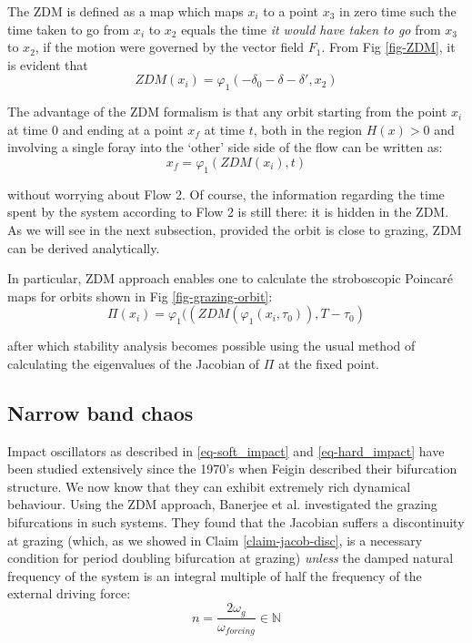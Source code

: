 \documentclass{book}
\renewcommand{\(}{\begin{columns}}
\renewcommand{\)}{\end{columns}}
\newcommand{\<}[1]{\begin{column}{#1}}
\renewcommand{\>}{\end{column}}
\begin{document}
The ZDM is defined as a map which maps $x_i$ to a point $x_3$ in zero time 
such the time taken to go from $x_i$ to $x_2$ equals the time \emph{it would 
have taken to go} from 
$x_3$ to $x_2$, if the motion were governed by the vector field $F_1$.   From Fig \ref{fig-ZDM}, it is evident that \[
ZDM(x_i)=\varphi_1(-\delta_0-\delta-\delta',x_2)
\] 

The advantage of the ZDM formalism is that any orbit starting from the point 
$x_i$ at time $0$ and ending at a point $x_f$ at time $t$, both in the region $H(x)>0$ and involving a single foray 
into the `other' side side of the flow can be written as:
\begin{equation}
\label{trajeq-ZDM}
x_f=\varphi_1(ZDM(x_i),t)
\end{equation}

without worrying about Flow 2. Of course, the information regarding the time  
spent  by the system according to Flow 2 is still there: it is hidden in the ZDM.  As 
we will see in the next subsection, provided the orbit is close to grazing, 
ZDM can be derived analytically.  

In particular, ZDM approach enables one to calculate the stroboscopic Poincaré 
maps for orbits shown in Fig \ref{fig-grazing-orbit}:
\begin{equation}
\label{eq-pmap-ZDM}
\Pi(x_i)=\varphi_1((ZDM(\varphi_1(x_i,\tau_0)),T-\tau_0)
\end{equation}

after which stability analysis becomes possible using the usual method of 
calculating the eigenvalues of the Jacobian of $\Pi$ at the fixed point.  

\subsection{Narrow band chaos}
Impact oscillators as described in \eqref{eq-soft_impact} and 
\eqref{eq-hard_impact} have been studied extensively since the 1970's when 
Feigin \cite{feigin-1970} described their bifurcation structure.  We now know 
that they can exhibit extremely rich dynamical behaviour.  
Using the ZDM approach, Banerjee et al. \cite{banerjee-kundu-soft} investigated 
the grazing bifurcations in such systems.  They found that the Jacobian 
suffers a discontinuity at grazing (which, as we showed in 
Claim \ref{claim-jacob-disc}, is a necessary condition for period doubling 
bifurcation at grazing) \emph{unless} the damped natural frequency of the system 
is an integral multiple of half the frequency of the external driving force:
\begin{equation}
\label{cond-chaos-vanish}
n=\frac{2\omega_g}{\omega_{forcing}}\in \mathbb{N}
\end{equation}
\end{document}
